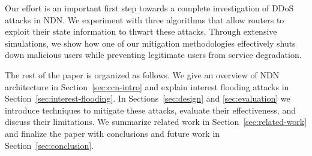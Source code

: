 Our effort is an important first step towards a complete investigation of DDoS attacks in NDN. We experiment with three algorithms that allow routers to exploit their state information to thwart these attacks. Through extensive simulations, we show how one of our mitigation methodologies effectively shuts down malicious users while preventing legitimate users from service degradation. 

The rest of the paper is organized as follows. We give an overview of NDN architecture in Section~\ref{sec:ccn-intro} and explain interest flooding attacks in Section~\ref{sec:interest-flooding}. In Sections~\ref{sec:design} and \ref{sec:evaluation} we introduce techniques to mitigate these attacks, evaluate their effectiveness, and discuss their limitations. We summarize related work in Section~\ref{sec:related-work} and finalize the paper with conclusions and future work in Section~\ref{sec:conclusion}. 




